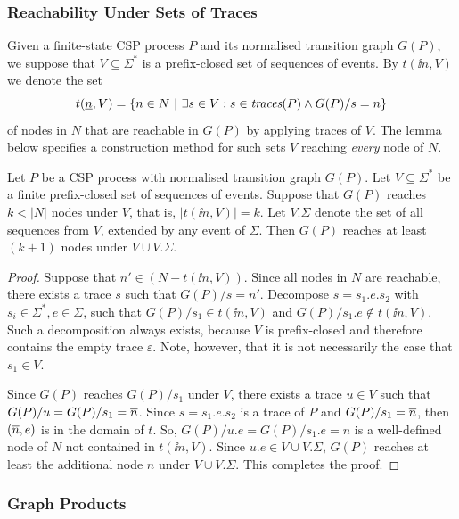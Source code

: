 \subsubsection*{Reachability Under Sets of Traces}
\label{sec:V} Given a finite-state CSP process $P$ and its normalised
transition graph $G(P)$,
we suppose that $V\subseteq\Sigma^*$ is a prefix-closed set  of sequences of
events. By $t(\ii n,V)$ we denote the set
\[
t(\underline{n},V) = \{ n\in N~|~\exists s\in V: s\in\text{\it traces}(P)\wedge G(P)/s = n \}
\]
of nodes in $N$ that are reachable in $G(P)$ by applying traces of $V$. The
lemma below specifies a construction method for such sets $V$ reaching {\it
every} node of $N$.

\begin{lemma}
\label{lemma:extendV} Let $P$ be a CSP process with normalised transition
graph $G(P)$. 
Let
$V\subseteq\Sigma^*$ be a finite prefix-closed set of sequences of events.
Suppose that  $G(P)$ reaches $k < |N|$ nodes under $V$, that is, $|t(\ii
n,V)| = k$. Let $V.\Sigma$ denote the set of all sequences from $V$, extended
by any event of $\Sigma$. Then $G(P)$ reaches at least $(k+1)$ nodes under
$V\cup V.\Sigma$.
\end{lemma}
\begin{proof}
Suppose that $n'\in (N - t(\ii n,V))$.  Since all nodes in $N$ are reachable,
there exists a trace $s$ such that $G(P)/s = n'$. Decompose $s = s_1.e.s_2$
with $s_i\in\Sigma^*, e\in\Sigma$, such that $G(P)/s_1 \in t(\ii n,V)$ and
$G(P)/s_1.e \not\in t(\ii n,V)$. Such a decomposition always exists, because
$V$ is prefix-closed and therefore contains the empty trace $\varepsilon$.
Note, however, that it is not necessarily the case that $s_1\in V$.

Since $G(P)$ reaches $G(P)/s_1$ under $V$, there exists a trace $u\in V$ such
that $G(P)/u = G(P)/s_1 = \overline n$. Since $s = s_1.e.s_2$ is a trace of $P$ and
$G(P)/s_1 = \overline n$, then $(\overline n,e)$ is in the domain of $t$. So, $ G(P)/u.e
= G(P)/s_1.e = n$ is a well-defined node of $N$ not contained in $t(\ii
n,V)$. Since $u.e\in V\cup V.\Sigma$, $G(P)$ reaches at least the additional
node $n$ under $V\cup V.\Sigma$. This completes the proof. \xbox
\end{proof}

\subsubsection*{Graph Products}
\label{sec:GP}

